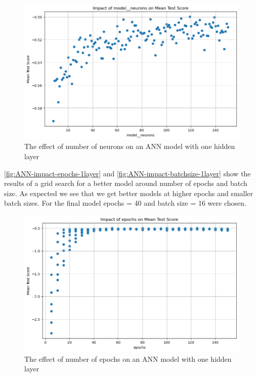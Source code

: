 \documentclass{article}
\begin{document}
\begin{figure}
	\centering
	\includegraphics[width=\linewidth]{figures/ANN_impact_neurons_1layer.png}
	\caption{The effect of number of neurons on an ANN model with one hidden layer}
	\label{fig:ANN-impact-neurons-1layer}
\end{figure}

\autoref{fig:ANN-impact-epochs-1layer} and \autoref{fig:ANN-impact-batchsize-1layer} show the results of a grid search for a better model around number of epochs and batch size.
As expected we see that we get better models at higher epochs and smaller batch sizes. For the final model epochs = 40 and batch size = 16 were chosen.


\begin{figure}
	\centering
	\includegraphics[width=\linewidth]{figures/ANN_impact_epochs_1layer.png}
	\caption{The effect of number of epochs on an ANN model with one hidden layer}
	\label{fig:ANN-impact-epochs-1layer}
\end{figure}
\end{document}
